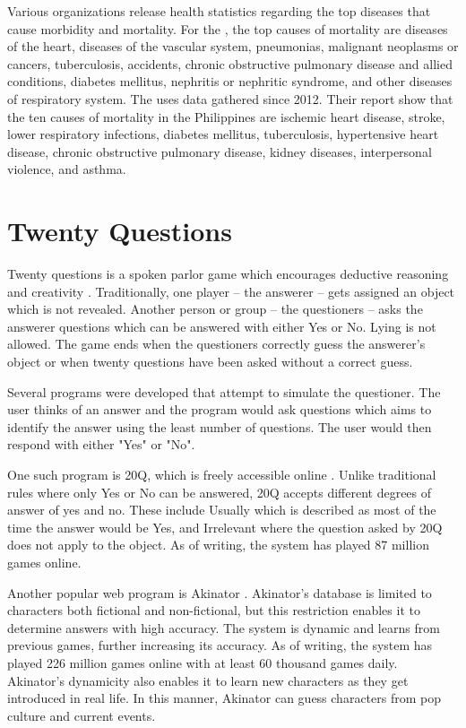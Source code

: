 Various organizations release health statistics regarding the top diseases that cause morbidity and mortality. 
For the \citet{phdoh:2016}, the top causes of mortality are diseases of the heart, diseases of the vascular system, pneumonias, malignant neoplasms or cancers, tuberculosis, accidents, chronic obstructive pulmonary disease and allied conditions, diabetes mellitus, nephritis or nephritic syndrome, and other diseases of respiratory system. 
The \citet{who:2015} uses data gathered since 2012.
Their report show that the ten causes of mortality in the Philippines are ischemic heart disease, stroke, lower respiratory infections, diabetes mellitus, tuberculosis, hypertensive heart disease, chronic obstructive pulmonary disease, kidney diseases, interpersonal violence, and asthma.

\section{Twenty Questions}
Twenty questions is a spoken parlor game which encourages deductive reasoning and creativity \cite{wiki:twenty_questions}.
Traditionally, one player -- the answerer -- gets assigned an object which is not revealed.
Another person or group -- the questioners -- asks the answerer questions which can be answered with either Yes or No. 
Lying is not allowed.
The game ends when the questioners correctly guess the answerer's object or when twenty questions have been asked without a correct guess.

Several programs were developed that attempt to simulate the questioner. 
The user thinks of an answer and the program would ask questions which aims to identify the answer using the least number of questions. The user would then respond with either "Yes" or "No".

One such program is 20Q, which is freely accessible online \cite{20q:2016}. 
Unlike traditional rules where only Yes or No can be answered, 20Q accepts different degrees of answer of yes and no.
These include Usually which is described as most of the time the answer would be Yes, and Irrelevant where the question asked by 20Q does not apply to the object.
As of writing, the system has played 87 million games online.

Another popular web program is Akinator \cite{Akinator:2016}.
Akinator's database is limited to characters both fictional and non-fictional, but this restriction enables it to determine answers with high accuracy.
The system is dynamic and learns from previous games, further increasing its accuracy.
As of writing, the system has played 226 million games online with at least 60 thousand games daily.
Akinator's dynamicity also enables it to learn new characters as they get introduced in real life.
In this manner, Akinator can guess characters from pop culture and current events.
